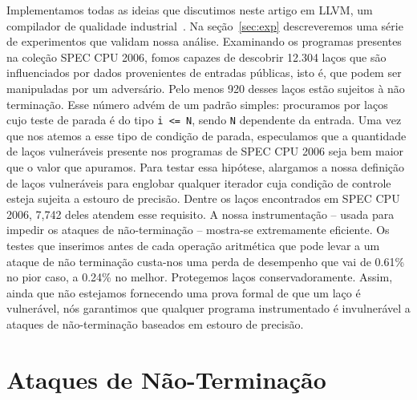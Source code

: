 \documentclass{llncs}
\begin{document}
Implementamos todas as ideias que discutimos neste artigo em LLVM,
um compilador de qualidade industrial~\cite{Lattner04}.
Na seção~\ref{sec:exp} descreveremos uma série de experimentos que
validam nossa análise.
Examinando os programas presentes na coleção SPEC CPU 2006, fomos capazes
de descobrir 12.304 laços que são influenciados por dados provenientes de
entradas públicas, isto é, que podem ser manipuladas por um adversário.
Pelo menos 920 desses laços estão sujeitos à não terminação.
Esse número advém de um padrão simples: procuramos por
laços cujo teste de parada é do tipo \texttt{i <= N}, sendo \texttt{N}
dependente da entrada.
Uma vez que nos atemos a esse tipo de condição de parada, especulamos que
a quantidade de laços vulneráveis presente nos programas de SPEC CPU 2006
seja bem maior que o valor que apuramos.
Para testar essa hipótese, alargamos a nossa definição de laços vulneráveis
para englobar qualquer iterador cuja condição de controle esteja sujeita a
estouro de precisão.
Dentre os laços encontrados em SPEC CPU 2006, 7,742 deles atendem esse
requisito.
A nossa instrumentação -- usada para impedir os ataques de não-terminação --
mostra-se extremamente eficiente.
Os testes que inserimos antes de cada operação aritmética que pode levar a
um ataque de não terminação custa-nos uma perda de desempenho que vai de
0.61\% no pior caso, a 0.24\% no melhor.
Protegemos laços conservadoramente.
Assim, ainda que não estejamos fornecendo uma prova formal de que um laço é
vulnerável, nós garantimos que qualquer programa instrumentado é invulnerável
a ataques de não-terminação baseados em estouro de precisão.

\section{Ataques de Não-Terminação}
\label{sec:bkg}
\end{document}
